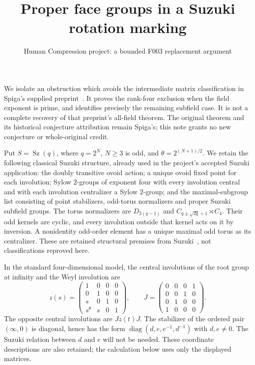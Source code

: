 \documentclass[11pt,a4paper]{article}
\title{Proper face groups in a Suzuki rotation marking}
\author{Human Compression project: a bounded F003 replacement argument}
\date{}
\begin{document}
\maketitle

We isolate an obstruction which avoids the intermediate matrix
classification in Spiga's supplied preprint~\cite{Spiga}. It proves the
rank-four exclusion when the field exponent is prime, and identifies
precisely the remaining subfield case. It is not a complete recovery of
that preprint's all-field theorem. The original theorem and its
historical conjecture attribution remain Spiga's; this note grants no
new conjecture or whole-original credit.

Put $S=\operatorname{Sz}(q)$, where $q=2^N$, $N\geq3$ is odd, and
$\theta=2^{(N+1)/2}$. We retain the following classical Suzuki structure,
already used in the project's accepted Suzuki application: the doubly
transitive ovoid action; a unique ovoid fixed point for each involution;
Sylow $2$-groups of exponent four with every involution central and with
each involution centralizer a Sylow $2$-group; and the
maximal-subgroup list consisting of point stabilizers, odd-torus
normalizers and proper Suzuki subfield groups. The torus normalizers
are $D_{2(q-1)}$ and $C_{q\pm\sqrt{2q}+1}\rtimes C_4$. Their odd kernels
are cyclic, and every involution outside that kernel acts on it by
inversion. A nonidentity odd-order element has a unique maximal odd
torus as its centralizer. These are retained structural premises from
Suzuki~\cite{Suzuki}, not classifications reproved here.

In the standard four-dimensional model, the central involutions of the
root group at infinity and the Weyl involution are
\[
 z(s)=\begin{pmatrix}1&0&0&0\\0&1&0&0\\s&0&1&0\\s^\theta&s&0&1\end{pmatrix},
 \qquad J=\begin{pmatrix}0&0&0&1\\0&0&1&0\\0&1&0&0\\1&0&0&0\end{pmatrix}.
\]
The opposite central involutions are $Jz(t)J$. The stabilizer of the
ordered pair $(\infty,0)$ is diagonal, hence has the form
$\operatorname{diag}(d,e,e^{-1},d^{-1})$ with $d,e\ne0$. The Suzuki
relation between $d$ and $e$ will not be needed. These coordinate
descriptions are also retained; the calculation below uses only the
displayed matrices.
\end{document}
